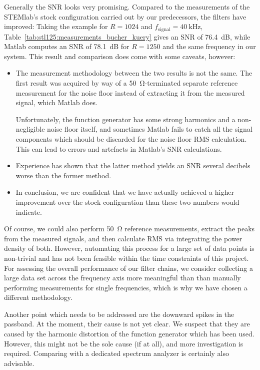 Generally the  SNR looks very  promising. Compared to the measurements  of the
STEMlab's stock  configuration carried  out by  our predecessors,  the filters
have  improved: Taking  the  example  for $R=1024$  and  $f_\mathrm{signal}  =
\SI{40}{\kHz}$, Table~\ref{tab:stl125:measurements_bucher_kuery}  gives an SNR
of \SI{76.4}{\dB}, while Matlab computes an SNR of \SI{78.1}{\dB} for $R=1250$
and the  same frequency in  our system. This  result and comparison  does come
with some caveats, however:
\begin{itemize}\tightlist
    \item
        The   measurement  methodology   between  the   two  results   is  not
        the   same. The   first   result   was    acquired   by   way   of   a
        \SI{50}{\ohm}-terminated separate reference  measurement for the noise
        floor instead of extracting it  from the measured signal, which Matlab
        does.

        Unfortunately, the function generator has  some strong harmonics and a
        non-negligible noise floor itself, and sometimes Matlab fails to catch
        all  the signal  components which  should be  discarded for  the noise
        floor  RMS  calculation. This can  lead  to  errors and  artefacts  in
        Matlab's SNR calculations.
    \item
        Experience  has shown  that the  latter method  yields an  SNR several
        decibels worse than the former method.
    \item
        In  conclusion, we  are confident  that  we have  actually achieved  a
        higher improvement over the stock configuration than these two numbers
        would indicate.
\end{itemize}
Of course, we could also perform \SI{50}{\ohm} reference measurements, extract
the peaks  from the measured signals,  and then calculate RMS  via integrating
the power density of both. However, automating this process for a large set of
data  points  is  non-trivial  and  has not  been  feasible  within  the  time
constraints  of this  project. For assessing  the overall  performance of  our
filter chains,  we consider collecting a  large data set across  the frequency
axis more  meaningful than  than manually  performing measurements  for single
frequencies, which is why we have chosen a different methodology.

Another  point which  needs to  be addressed  are the  downward spikes  in the
passband.  At the  moment, their cause is not yet  clear. We suspect that they
are caused by the harmonic distortion of the function generator which has been
used. However,  this  might not  be  the  sole cause  (if  at  all), and  more
investigation is  required.  Comparing with  a dedicated spectrum  analyzer is
certainly also advisable.

